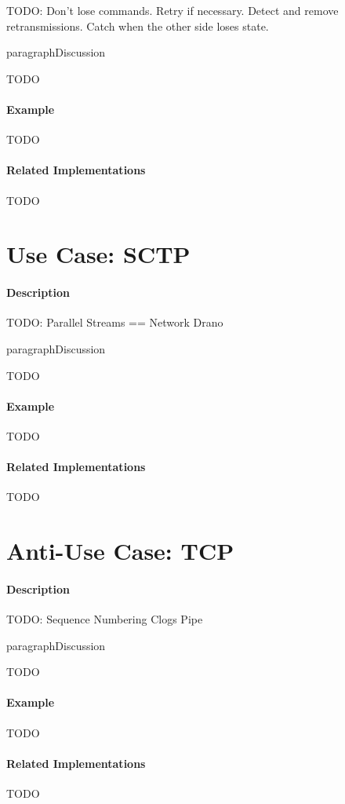 {\Large TODO:} Don't lose commands. Retry if necessary. Detect and remove retransmissions. Catch when the other side loses state.

paragraph{Discussion}

{\Large TODO}

\paragraph{Example}

{\Large TODO}

\paragraph{Related Implementations}

{\Large TODO}

\section{Use Case: SCTP}

\paragraph{Description}

{\Large TODO:} Parallel Streams == Network Drano\texttrademark

paragraph{Discussion}

{\Large TODO}

\paragraph{Example}

{\Large TODO}

\paragraph{Related Implementations}

{\Large TODO}

\section{Anti-Use Case: TCP}

\paragraph{Description}

{\Large TODO:} Sequence Numbering Clogs Pipe

paragraph{Discussion}

{\Large TODO}

\paragraph{Example}

{\Large TODO}

\paragraph{Related Implementations}

{\Large TODO}
